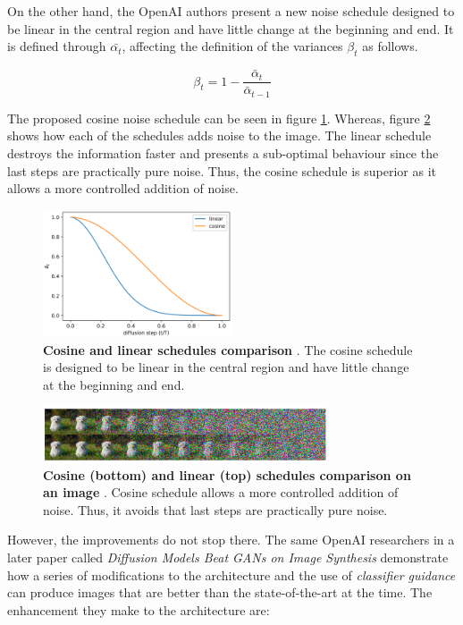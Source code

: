 On the other hand, the OpenAI authors present a new noise schedule designed to be linear in the central region and have little change at the beginning and end. It is defined through $ \bar{\alpha_t}$, affecting the definition of the variances $\beta_t$ as follows.

\[\beta_t = 1 - \frac{\bar{\alpha}_t}{\bar{\alpha}_{t-1}}\]

The proposed cosine noise schedule can be seen in figure \ref{fig:CosineSC}. Whereas, figure \ref{fig:CosineEX} shows how each of the schedules adds noise to the image. The linear schedule destroys the information faster and presents a sub-optimal behaviour since the last steps are practically pure noise. Thus, the cosine schedule is superior as it allows a more controlled addition of noise.

\begin{figure}
    \centering
    \includegraphics[width=0.50\textwidth]{Pictures/cosineSC.png} 
    \caption{\textbf{Cosine and linear schedules comparison }\cite{nichol2021improved}. The cosine schedule is designed to be linear in the central region and have little change at the beginning and end.}
    \label{fig:CosineSC}
\end{figure}

\begin{figure}
    \centering
    \includegraphics[width=0.75\textwidth]{Pictures/cosineEX.png} 
    \caption{\textbf{Cosine (bottom) and linear (top) schedules comparison on an image} \cite{nichol2021improved}. Cosine schedule allows a more controlled addition of noise. Thus, it avoids that last steps are practically pure noise.}
    \label{fig:CosineEX}
\end{figure}

However, the improvements do not stop there. The same OpenAI researchers in a later paper called \textit{Diffusion Models Beat GANs on Image Synthesis} \cite{dhariwal2021diffusion} demonstrate how a series of modifications to the architecture and the use of \textit{classifier guidance} can produce images that are better than the state-of-the-art at the time. The enhancement they make to the architecture are:

